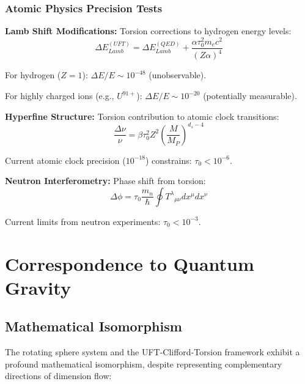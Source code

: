 \documentclass[12pt,a4paper]{article}
\begin{document}
\subsubsection{Atomic Physics Precision Tests}

\textbf{Lamb Shift Modifications:}
Torsion corrections to hydrogen energy levels:
\begin{equation}
    \Delta E_{Lamb}^{(UFT)} = \Delta E_{Lamb}^{(QED)} + \frac{\alpha \tau_0^2 m_e c^2}{(Z\alpha)^4}
\end{equation}

For hydrogen ($Z=1$): $\Delta E/E \sim 10^{-48}$ (unobservable).

For highly charged ions (e.g., $U^{91+}$): $\Delta E/E \sim 10^{-20}$ (potentially measurable).

\textbf{Hyperfine Structure:}
Torsion contribution to atomic clock transitions:
\begin{equation}
    \frac{\Delta \nu}{\nu} = \beta \tau_0^2 Z^2 \left(\frac{M}{M_P}\right)^{d_s-4}
\end{equation}

Current atomic clock precision ($10^{-18}$) constrains: $\tau_0 < 10^{-6}$.

\textbf{Neutron Interferometry:}
Phase shift from torsion:
\begin{equation}
    \Delta \phi = \tau_0 \frac{m_n}{\hbar} \oint T^\lambda{}_{\mu\nu} dx^\mu dx^\nu
\end{equation}

Current limits from neutron experiments: $\tau_0 < 10^{-3}$.

\section{Correspondence to Quantum Gravity}
\label{sec:correspondence}

\subsection{Mathematical Isomorphism}

The rotating sphere system and the UFT-Clifford-Torsion framework exhibit a profound mathematical isomorphism, despite representing complementary directions of dimension flow:
\end{document}
